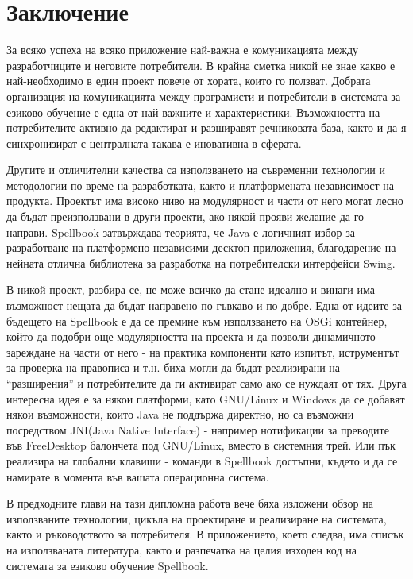 \chapter{Заключение}
За всяко успеха на всяко приложение най-важна е комуникацията между
разработчиците и неговите потребители. В крайна сметка никой не знае
какво е най-необходимо в един проект повече от хората, които го
ползват. Добрата организация на комуникацията между програмисти и
потребители в системата за езиково обучение е една от най-важните и
характеристики. Възможността на потребителите активно да редактират и
разширавят речниковата база, както и да я синхронизират с централната
такава е иновативна в сферата.

Другите и отличителни качества са използването на съвременни
технологии и методологии по време на разработката, както и
платформената независимост на продукта. Проектът има високо ниво на
модулярност и части от него могат лесно да бъдат преизползвани в други
проекти, ако някой прояви желание да го направи. Spellbook затвърждава
теорията, че Java е логичният избор за разработване на платформено
независими десктоп приложения, благодарение на нейната отлична
библиотека за разработка на потребителски интерфейси Swing.

В никой проект, разбира се, не може всичко да стане идеално и винаги
има възможност нещата да бъдат направено по-гъвкаво и по-добре. Една
от идеите за бъдещето на Spellbook е да се премине към използването на
OSGi контейнер, който да подобри още модулярността на проекта и да
позволи динамичното зареждане на части от него - на практика
компоненти като изпитът, иструментът за проверка на правописа и
т.н. биха могли да бъдат реализирани на "`разширения"' и потребителите
да ги активират само ако се нуждаят от тях. Друга интересна идея е за
някои платформи, като GNU/Linux и Windows да се добавят някои
възможности, които Java не поддържа директно, но са възможни
посредством JNI(Java Native Interface) - например нотификации за
преводите във FreeDesktop балончета под GNU/Linux, вместо в системния
трей. Или пък реализира на глобални клавиши - команди в Spellbook
достъпни, където и да се намирате в момента във вашата операционна
система. 

В предходните глави на тази дипломна работа вече бяха изложени обзор
на използваните технологии, цикъла на проектиране и реализиране на
системата, както и ръководството за потребителя. В приложението, което
следва, има списък на използваната литература, както и разпечатка на
целия изходен код на системата за езиково обучение Spellbook.

